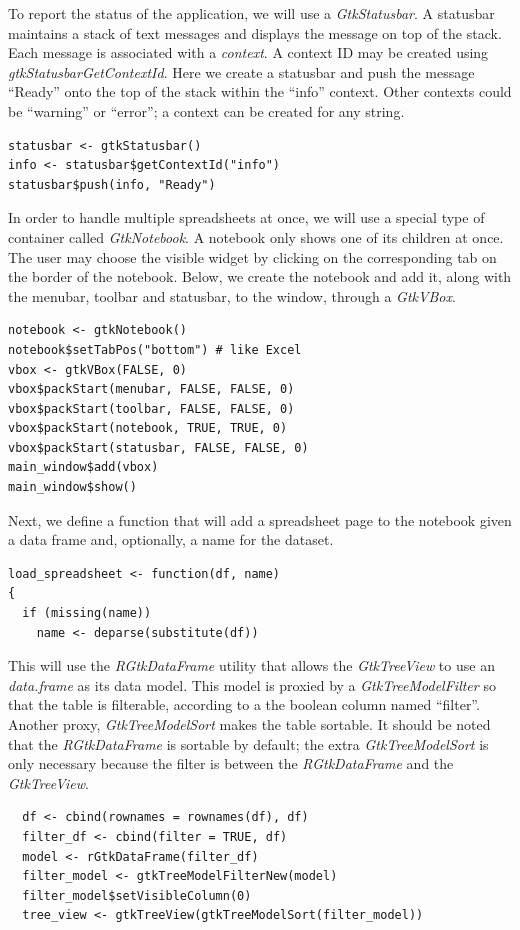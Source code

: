 \documentclass[article]{jss}
\begin{document}
To report the status of the application, we will use a \emph{GtkStatusbar}. 
A statusbar maintains a stack of text messages and displays the message
on top of the stack. Each message is associated with a \emph{context}. A context
ID may be created using \emph{gtkStatusbarGetContextId}. Here we create a 
statusbar and push the message ``Ready'' onto the top of the stack within
the ``info'' context. Other contexts could be ``warning'' or ``error''; a context
can be created for any string.
\begin{verbatim}
statusbar <- gtkStatusbar()
info <- statusbar$getContextId("info")
statusbar$push(info, "Ready") 
\end{verbatim}
In order to handle multiple spreadsheets at once, we will use a special type
of container called \emph{GtkNotebook}. A notebook only shows one of its children
at once. The user may choose the visible widget by 
clicking on the corresponding tab on the border of the notebook. Below,
we create the notebook and add it, along with the menubar, toolbar and statusbar, to the
window, through a \emph{GtkVBox}.
\begin{verbatim}
notebook <- gtkNotebook()
notebook$setTabPos("bottom") # like Excel
vbox <- gtkVBox(FALSE, 0)
vbox$packStart(menubar, FALSE, FALSE, 0)
vbox$packStart(toolbar, FALSE, FALSE, 0)
vbox$packStart(notebook, TRUE, TRUE, 0)
vbox$packStart(statusbar, FALSE, FALSE, 0)
main_window$add(vbox)
main_window$show()
\end{verbatim}
Next, we define a function that will add a spreadsheet page to the notebook
given a data frame and, optionally, a name for the dataset.
\begin{verbatim}
load_spreadsheet <- function(df, name)
{
  if (missing(name))
    name <- deparse(substitute(df))
\end{verbatim}
This will use the \emph{RGtkDataFrame} utility that allows
the \emph{GtkTreeView} to use an 
\emph{data.frame} as its data model. This model is proxied by a \emph{GtkTreeModelFilter}
so that the table is filterable, according to
a the boolean column named ``filter''. Another proxy, \emph{GtkTreeModelSort}
makes the table sortable. It should be
noted that the \emph{RGtkDataFrame} is sortable by default; the extra 
\emph{GtkTreeModelSort} is only necessary because the filter is between the
\emph{RGtkDataFrame} and the \emph{GtkTreeView}.
\begin{verbatim}
  df <- cbind(rownames = rownames(df), df)
  filter_df <- cbind(filter = TRUE, df)
  model <- rGtkDataFrame(filter_df)
  filter_model <- gtkTreeModelFilterNew(model)
  filter_model$setVisibleColumn(0)
  tree_view <- gtkTreeView(gtkTreeModelSort(filter_model))
\end{verbatim}
\end{document}
